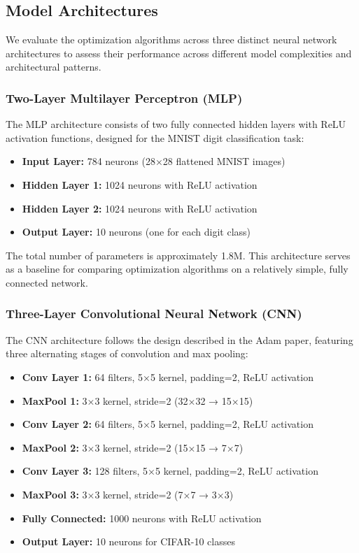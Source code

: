\documentclass[12pt]{article}
\begin{document}
\subsection{Model Architectures}

We evaluate the optimization algorithms across three distinct neural network architectures to assess their performance across different model complexities and architectural patterns.

\subsubsection{Two-Layer Multilayer Perceptron (MLP)}

The MLP architecture consists of two fully connected hidden layers with ReLU activation functions, designed for the MNIST digit classification task:

\begin{itemize}
    \item \textbf{Input Layer:} 784 neurons (28×28 flattened MNIST images)
    \item \textbf{Hidden Layer 1:} 1024 neurons with ReLU activation
    \item \textbf{Hidden Layer 2:} 1024 neurons with ReLU activation  
    \item \textbf{Output Layer:} 10 neurons (one for each digit class)
\end{itemize}

The total number of parameters is approximately 1.8M. This architecture serves as a baseline for comparing optimization algorithms on a relatively simple, fully connected network.

\subsubsection{Three-Layer Convolutional Neural Network (CNN)}

The CNN architecture follows the design described in the Adam paper, featuring three alternating stages of convolution and max pooling:

\begin{itemize}
    \item \textbf{Conv Layer 1:} 64 filters, 5×5 kernel, padding=2, ReLU activation
    \item \textbf{MaxPool 1:} 3×3 kernel, stride=2 (32×32 → 15×15)
    \item \textbf{Conv Layer 2:} 64 filters, 5×5 kernel, padding=2, ReLU activation
    \item \textbf{MaxPool 2:} 3×3 kernel, stride=2 (15×15 → 7×7)
    \item \textbf{Conv Layer 3:} 128 filters, 5×5 kernel, padding=2, ReLU activation
    \item \textbf{MaxPool 3:} 3×3 kernel, stride=2 (7×7 → 3×3)
    \item \textbf{Fully Connected:} 1000 neurons with ReLU activation
    \item \textbf{Output Layer:} 10 neurons for CIFAR-10 classes
\end{itemize}
\end{document}
